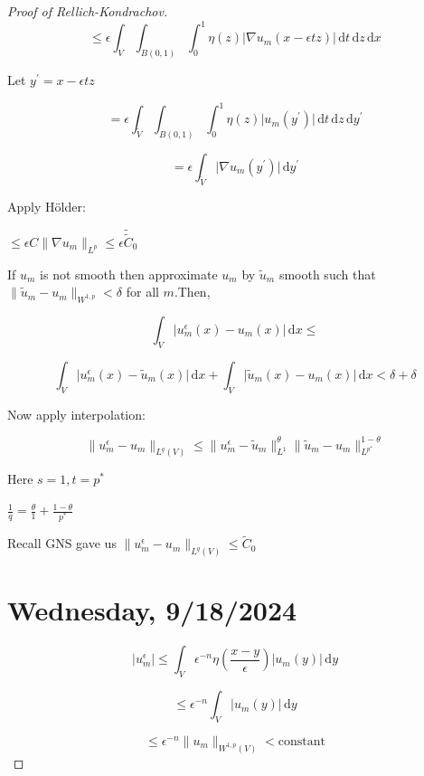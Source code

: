\documentclass{article}
\theoremstyle{definition}
\begin{document}
\begin{proof}[Proof of Rellich-Kondrachov]
    \[
        \leq \epsilon \int_{V}^{} \int_{B(0,1)}^{} \int_{0}^{1} \eta (z) \vert \nabla u_m (x - \epsilon  t z) \vert  \,\mathrm{d}t  \,\mathrm{d}z  \,\mathrm{d}x 
    \]

    Let \(y^{\prime} = x - \epsilon t z\) 

    \[
        = \epsilon \int_{\tilde{V}}^{} \int_{B(0,1)}^{} \int_{0}^{1} \eta (z) \vert u_m(y^{\prime}) \vert  \,\mathrm{d}t  \,\mathrm{d}z  \,\mathrm{d}y^{\prime}  
    \]

    \[
        = \epsilon \int_{\tilde{V}}^{} \vert \nabla u_m(y^{\prime}) \vert \,\mathrm{d}y^{\prime}
    \]

    Apply H\"older:

    \(\leq \epsilon C \lVert \nabla u_m \rVert _{L^p} \leq \epsilon \tilde{\tilde{C}}_0\) 

    If \(u_m\) is not smooth then approximate \(u_m\) by \(\tilde{u}_m\) smooth such that \(\lVert \tilde{u}_m - u_m \rVert _{W^{1,p}} < \delta\) for all \(m\).Then,
    
    \[
        \int_{V}^{} \vert u_m ^ \epsilon (x) - u_m(x) \vert  \,\mathrm{d}x \leq 
    \]

    \[
        \int_{V}^{} \vert u_m ^ \epsilon (x) - \tilde{u}_m (x) \vert  \,\mathrm{d}x + \int_{V}^{} \vert \tilde{u}_m(x) - u_m(x) \vert  \,\mathrm{d}x < \delta + \delta
    \]

    Now apply interpolation:

    \[
        \lVert u_m^{\epsilon} - u _m  \rVert _{L^q(V)} \leq \lVert u_m ^ \epsilon - \tilde{u}_m \rVert ^ \theta _{L^1} \lVert \tilde{u}_m - u_m \rVert ^{1-\theta}_{L^{p^{\ast}}} 
    \]
    
    Here \(s = 1, t = p^{\ast}\) 

    \(\frac{1}{q} = \frac{\theta}{1} + \frac{1-\theta}{p^{\ast}}\) 

    Recall GNS gave us \(\lVert u_m^{\epsilon} - u_m  \rVert _{L^q(V)} \leq \tilde{C}_0\) 

\section*{Wednesday, 9/18/2024}

\[
    \vert u_m^{\epsilon} \vert \leq \int_V \epsilon ^{-n} \eta \left( \frac{x-y}{\epsilon} \right) \vert u_m(y) \vert \, \mathrm{d}y
\]

\[
    \leq \epsilon^{-n} \int_V \vert u_m(y) \vert \, \mathrm{d}y
\]

\[
    \leq \epsilon ^{-n} \lVert u_m \rVert _{W^{1,p}(V)} < \text{constant}
\]


\end{proof}
\end{document}
